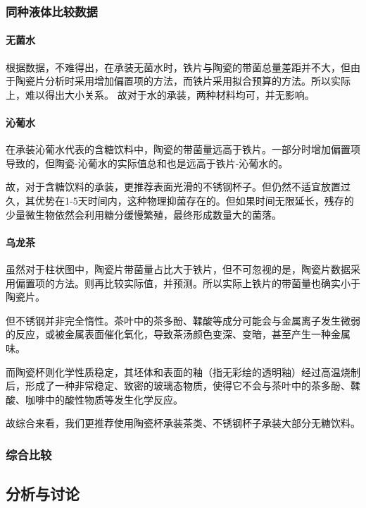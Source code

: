 \documentclass[12pt,a4paper]{article}
\begin{document}
\subsubsection{同种液体比较数据}
\paragraph{无菌水}

根据数据，不难得出，在承装无菌水时，铁片与陶瓷的带菌总量差距并不大，但由于陶瓷片分析时采用增加偏置项的方法，而铁片采用拟合预算的方法。所以实际上，难以得出大小关系。
故对于水的承装，两种材料均可，并无影响。


\paragraph{沁葡水}
在承装沁葡水代表的含糖饮料中，陶瓷的带菌量远高于铁片。一部分时增加偏置项导致的，但陶瓷-沁葡水的实际值总和也是远高于铁片-沁葡水的。

故，对于含糖饮料的承装，更推荐表面光滑的不锈钢杯子。但仍然不适宜放置过久，其优势在1-5天时间内，这种物理抑菌存在的。但如果时间无限延长，残存的少量微生物依然会利用糖分缓慢繁殖，最终形成数量大的菌落。

\paragraph{乌龙茶}
虽然对于柱状图中，陶瓷片带菌量占比大于铁片，但不可忽视的是，陶瓷片数据采用偏置项的方法。则再比较实际值，并预测。所以实际上铁片的带菌量也确实小于陶瓷片。

但不锈钢并非完全惰性。茶叶中的茶多酚、鞣酸等成分可能会与金属离子发生微弱的反应，或被金属表面催化氧化，导致茶汤颜色变深、变暗，甚至产生一种金属味。\cite{JSHJ201504002}

而陶瓷杯则化学性质稳定，其坯体和表面的釉（指无彩绘的透明釉）经过高温烧制后，形成了一种非常稳定、致密的玻璃态物质，使得它不会与茶叶中的茶多酚、鞣酸、咖啡中的酸性物质等发生化学反应。 

故综合来看，我们更推荐使用陶瓷杯承装茶类、不锈钢杯子承装大部分无糖饮料。



\subsubsection{综合比较}

\subsection{分析与讨论}
\end{document}
